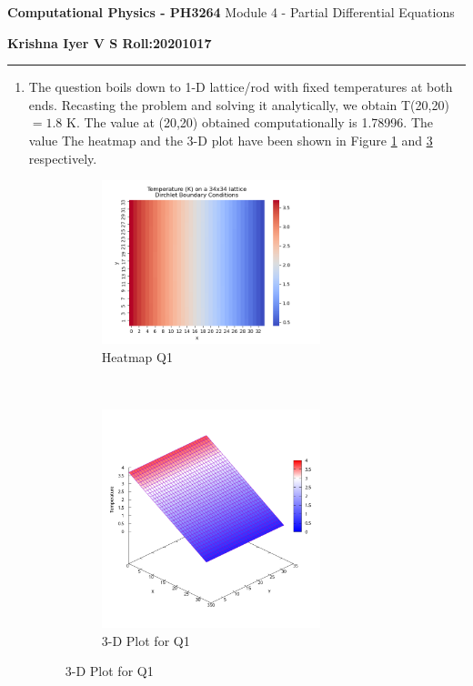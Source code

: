 \documentclass[11 pt]{article}
\begin{document}
\begin{center}
       \large{
       \textbf{Computational Physics - PH3264} \break
       Module 4 - Partial Differential Equations
}
\end{center}
\textbf{Krishna Iyer V S \hfill Roll:20201017}
\hrule 
\vspace{0.3cm}

\begin{enumerate}
\item
The question boils down to 1-D lattice/rod with fixed temperatures at both ends. Recasting the problem and solving it analytically, we obtain T(20,20)$=1.8$ K. The value at (20,20) obtained computationally is 1.78996.
 The value The heatmap and the 3-D plot have been shown in Figure \ref{q1_heatmap} and \ref{q1_3dplot} respectively.
\begin{figure}[ht!]
\centering
\begin{subfigure}{0.5\textwidth}
\includegraphics[width=2.5in]{../figures/Q1-heatmap.png}
\caption{Heatmap Q1}
\label{q1_heatmap}
\end{subfigure}%
~
\begin{subfigure}{0.5\textwidth}
\includegraphics[width=2.5in]{../figures/Q1-3d.png}
\caption{3-D Plot for Q1}
\label{q1_3dplot}
\end{subfigure}
\end{figure}


\end{enumerate}
\end{document}

